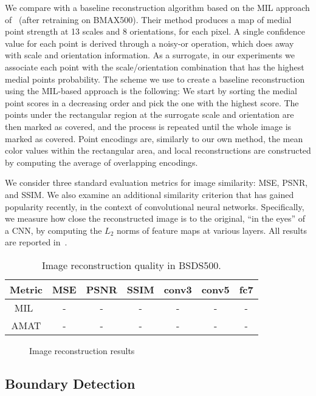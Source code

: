 \documentclass[10pt,twocolumn,letterpaper]{article}
\begin{document}
We compare with a baseline reconstruction algorithm based on the MIL approach 
of~\cite{tsogkas2012learning} (after retraining on BMAX500).
Their method produces a map of medial point strength at 13 scales and 8 orientations, for each pixel.
A single confidence value for each point is derived through a noisy-or operation,
which does away with scale and orientation information.
As a surrogate, in our experiments we associate each point with the scale/orientation combination
that has the highest medial points probability.
The scheme we use to create a baseline reconstruction using the MIL-based approach is the following:
We start by sorting the medial point scores in a decreasing order and pick the one with the highest score.
The points under the rectangular region at the surrogate scale and orientation are then marked as covered,
and the process is repeated until the whole image is marked as covered.
Point encodings are, similarly to our own method, the mean color values within the rectangular area, 
and local reconstructions are constructed by computing the average of overlapping encodings.

We consider three standard evaluation metrics for image similarity: MSE, PSNR, and SSIM.
We also examine an additional similarity criterion that has gained popularity recently, 
in the context of convolutional neural networks.
Specifically, we measure how close the reconstructed image is to the original,
``in the eyes'' of a CNN, by computing the $L_2$ norms of feature maps at various layers. 
All results are reported in~.

\begin{table}
\centering
\begin{tabular}{|c|c|c|c|c|c|c|}
\hline
Metric	&	MSE		&	PSNR	&	SSIM 	&	conv3	&	conv5	&	fc7	\\
\hline
MIL~\cite{tsogkas2012learning}	&	-	& - 	& 	- 	&	-	&	-	&	-	\\
\hline
AMAT	&	-	&	-	&	-	&	-	&	-	&	- 	\\
\hline
\end{tabular}
\caption{Image reconstruction quality in BSDS500.}
\label{tab:reconstruction}
\end{table}

\begin{figure}[t]
\centering
\caption{Image reconstruction results}
\label{fig:reconstruction}
\end{figure}


\subsection{Boundary Detection}\label{sec:experiments:edges}
\end{document}
